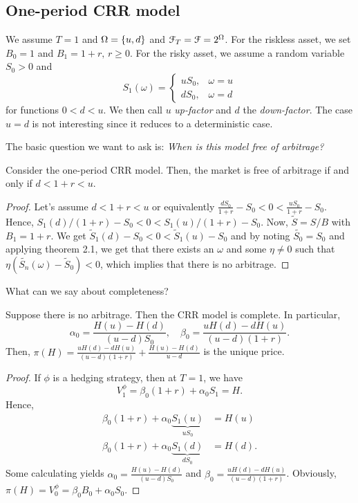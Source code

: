 \documentclass[12pt]{amsart}
\begin{document}
\subsection{One-period CRR model}

We assume \(T=1\) and \(\Omega=\left\{ u, d \right\}\) and \(\mathcal{F}_T = \mathcal{F} = 2^\Omega\). For the riskless asset, we set \(B_0=1\) and \(B_1 = 1+r,\, r \geq 0\). For the risky asset, we assume a random variable \(S_0 > 0\) and \[
    S_1(\omega) = \begin{cases}
        uS_0, &\omega=u\\
        dS_0, &\omega=d
    \end{cases}
\]
for functions \(0 < d < u\). We then call \(u\) \emph{up-factor} and \(d\) the \emph{down-factor}. The case \(u=d\) is not interesting since it reduces to a deterministic case.

The basic question we want to ask is: \emph{When is this model free of arbitrage?}

\begin{theorem}\label{th:CRR_NA}
    Consider the one-period CRR model. Then, the market is free of arbitrage if and only if \(d < 1 + r < u\).
\end{theorem}
\begin{proof}
    Let's assume \(d < 1+r < u\) or equivalently \(\frac{dS_0}{1+r} - S_0 < 0 < \frac{u S_0}{1+r} - S_0\). Hence, \(S_1(d)/(1+r)-S_0 < 0 < S_1(u)/(1+r)-S_0\). Now, \(\tilde{S} = S/B\) with \(B_1 = 1+r\). We get \(\tilde{S}_1(d) - S_0 < 0 < \tilde{S}_1(u) - S_0\) and by noting \(\tilde{S_0} = S_0\) and applying theorem 2.1, we get that there exists an \(\omega\) and some \(\eta \neq 0\) such that \(\eta(\tilde{S_n}(\omega) - \tilde{S}_0) < 0\), which implies that there is no arbitrage.
\end{proof}

What can we say about completeness?

\begin{theorem}\label{th:CRR_COMPLETE}
    Suppose there is no arbitrage. Then the CRR model is complete. In particular, \[
        \alpha_0 = \frac{H(u) - H(d)}{(u-d)S_0}, \quad \beta_0 = \frac{uH(d) - dH(u)}{(u-d)(1+r)}.
    \]
    Then, \(\pi(H) = \frac{uH(d) - dH(u)}{(u-d)(1+r)} + \frac{H(u)-H(d)}{u-d}\) is the unique price.
\end{theorem}
\begin{proof}
    If \(\phi\) is a hedging strategy, then at \(T=1\), we have \[
        V_1^\phi = \beta_0(1+r) + \alpha_0 S_1 = H.
    \]
    Hence, \begin{align*}
        \beta_0(1+r) + \alpha_0 \underbrace{S_1(u)}_{uS_0} &= H(u)\\
        \beta_0 (1+r) + \alpha_0 \underbrace{S_1(d)}_{dS_0} &= H(d).
    \end{align*}
    Some calculating yields \(\alpha_0=\frac{H(u)-H(d)}{(u-d)S_0}\) and \(\beta_0=\frac{uH(d)-dH(u)}{(u-d)(1+r)}\). Obviously, \(\pi(H)=V_0^\phi=\beta_0B_0+\alpha_0S_0\).
\end{proof}
\end{document}
